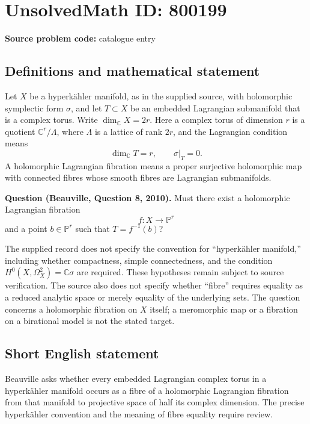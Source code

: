 \documentclass[11pt]{article}
\newcommand{\C}{\mathbb{C}}
\newcommand{\PP}{\mathbb{P}}
\begin{document}
\section*{UnsolvedMath ID: 800199}
\textbf{Source problem code:} catalogue entry
\subsection{Definitions and mathematical statement}
Let \(X\) be a hyperk\"ahler manifold, as in the supplied source, with holomorphic symplectic form \(\sigma\), and let \(T\subset X\) be an embedded Lagrangian submanifold that is a complex torus. Write \(\dim_{\C}X=2r\). Here a complex torus of dimension \(r\) is a quotient \(\C^r/\Lambda\), where \(\Lambda\) is a lattice of rank \(2r\), and the Lagrangian condition means
\[
\dim_{\C}T=r,\qquad \sigma|_T=0.
\]
A holomorphic Lagrangian fibration means a proper surjective holomorphic map with connected fibres whose smooth fibres are Lagrangian submanifolds.

\textbf{Question (Beauville, Question 8, 2010).} Must there exist a holomorphic Lagrangian fibration
\[
f:X\longrightarrow \PP^r
\]
and a point \(b\in\PP^r\) such that \(T=f^{-1}(b)\)?

The supplied record does not specify the convention for ``hyperk\"ahler manifold,'' including whether compactness, simple connectedness, and the condition \(H^0(X,\Omega_X^2)=\C\sigma\) are required. These hypotheses remain subject to source verification. The source also does not specify whether ``fibre'' requires equality as a reduced analytic space or merely equality of the underlying sets. The question concerns a holomorphic fibration on \(X\) itself; a meromorphic map or a fibration on a birational model is not the stated target.
\subsection{Short English statement}
Beauville asks whether every embedded Lagrangian complex torus in a hyperk\"ahler manifold occurs as a fibre of a holomorphic Lagrangian fibration from that manifold to projective space of half its complex dimension. The precise hyperk\"ahler convention and the meaning of fibre equality require review.
\end{document}
